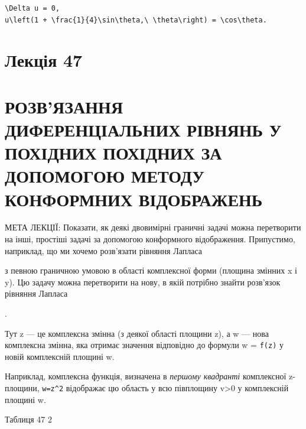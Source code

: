 \documentclass[
  ukrainian,
]{article}
\begin{document}
\begin{verbatim}
\Delta u = 0,
u\left(1 + \frac{1}{4}\sin\theta,\ \theta\right) = \cos\theta.
\end{verbatim}

\section{Лекція 47}\label{ux43bux435ux43aux446ux456ux44f-47}

\section{РОЗВ'ЯЗАННЯ ДИФЕРЕНЦІАЛЬНИХ РІВНЯНЬ У ПОХІДНИХ ПОХІДНИХ ЗА
ДОПОМОГОЮ МЕТОДУ КОНФОРМНИХ
ВІДОБРАЖЕНЬ}\label{ux440ux43eux437ux432ux44fux437ux430ux43dux43dux44f-ux434ux438ux444ux435ux440ux435ux43dux446ux456ux430ux43bux44cux43dux438ux445-ux440ux456ux432ux43dux44fux43dux44c-ux443-ux43fux43eux445ux456ux434ux43dux438ux445-ux43fux43eux445ux456ux434ux43dux438ux445-ux437ux430-ux434ux43eux43fux43eux43cux43eux433ux43eux44e-ux43cux435ux442ux43eux434ux443-ux43aux43eux43dux444ux43eux440ux43cux43dux438ux445-ux432ux456ux434ux43eux431ux440ux430ux436ux435ux43dux44c}

МЕТА ЛЕКЦІЇ: Показати, як деякі двовимірні граничні задачі можна
перетворити на інші, простіші задачі за допомогою конформного
відображення. Припустимо, наприклад, що ми хочемо розв'язати рівняння
Лапласа

з певною граничною умовою в області комплексної форми (площина змінних x
і y). Цю задачу можна перетворити на нову, в якій потрібно знайти
розв'язок рівняння Лапласа

.

Тут z --- це комплексна змінна (з деякої області площини z), а w ---
нова комплексна змінна, яка отримає значення відповідно до формули w =
\texttt{f(z)} у новій комплексній площині w.

Наприклад, комплексна функція, визначена в \emph{першому квадранті}
комплексної z-площини, \texttt{w=z\^{}2} відображає цю область у всю
півплощину v\textgreater0 у комплексній площині w.

Таблиця 47 2
\end{document}
